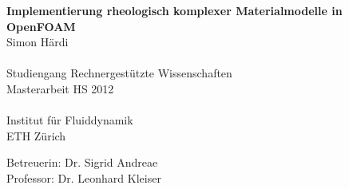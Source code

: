 {
    \fancyhf{}
    \fancyhfoffset[LR]{3em}
    \renewcommand{\headrulewidth}{0pt}
}
\begin{titlepage}
\begin{center}
    \vspace*{1cm}
    {\huge \bfseries Implementierung rheologisch komplexer Materialmodelle in OpenFOAM\\}
    \vspace{2cm}
    {\large 
        Simon Härdi\\
	~\\
	Studiengang Rechnergestützte Wissenschaften\\
	\vspace{3.5cm}
	Masterarbeit HS 2012\\
	~\\
	Institut für Fluiddynamik\\
	ETH Zürich\\
    }




{\large
	Betreuerin: Dr. Sigrid Andreae\\[\baselineskip]
	Professor: Dr. Leonhard Kleiser
}
\end{center}

\vspace*{2cm}

\end{titlepage}
